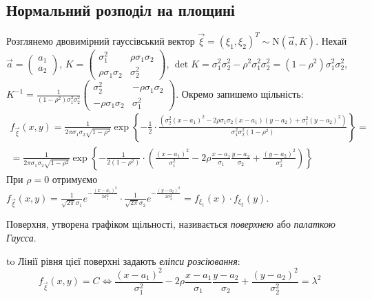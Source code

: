 \subsection{Нормальний розподіл на площині} 
Розглянемо двовимірний гауссівський вектор $\vec{\xi} = (\xi_1, \xi_2)^T \sim \mathrm{N}(\vec{a}, K)$.
Нехай $\vec{a} = \begin{pmatrix}
    a_1 \\ a_2
\end{pmatrix}$, $K = \begin{pmatrix}
    \sigma_1^2 & \rho \sigma_1 \sigma_2 \\
    \rho \sigma_1 \sigma_2 & \sigma_2^2
\end{pmatrix}$, $\det{K} = \sigma_1^2 \sigma_2^2 - \rho^2 \sigma_1^2 \sigma_2^2 = (1-\rho^2)\sigma_1^2\sigma_2^2$, 
$K^{-1} = \frac{1}{(1-\rho^2)\sigma_1^2\sigma_2^2}\begin{pmatrix}
    \sigma_2^2 & -\rho \sigma_1 \sigma_2 \\
    -\rho \sigma_1 \sigma_2 & \sigma_1^2
\end{pmatrix}$.
Окремо запишемо щільність:
\begin{equation}
    \begin{gathered}
        f_{\vec{\xi}}(x,y) = \frac{1}{2\pi\sigma_1\sigma_2\sqrt{1-\rho^2}} \exp\left\{-\frac{1}{2}\cdot
        \frac{\left( \sigma_2^2(x-a_1)^2 - 2\rho\sigma_1\sigma_2(x-a_1)(y-a_2) + \sigma_1^2(y-a_2)^2\right)}{\sigma_1^2\sigma_2^2(1-\rho^2)}
        \right\} = \\
        = \frac{1}{2\pi\sigma_1\sigma_2\sqrt{1-\rho^2}} \exp\left\{
            -\frac{1}{2(1-\rho^2)}\cdot
            \left(\frac{(x-a_1)^2}{\sigma_1^2} -
            2\rho\frac{x-a_1}{\sigma_1}\frac{y-a_2}{\sigma_2} +
            \frac{(y-a_2)^2}{\sigma_2^2}
            \right) 
        \right\}
    \end{gathered}
\end{equation}
При $\rho = 0$ отримуємо $f_{\vec{\xi}}(x,y) = \frac{1}{\sqrt{2\pi}\sigma_1} e^{-\frac{(x-a_1)^2}{2\sigma_1^2}} \cdot \frac{1}{\sqrt{2\pi}\sigma_2} e^{-\frac{(y-a_2)^2}{2\sigma_2^2}} = f_{\xi_1}(x)\cdot f_{\xi_2}(y)$.
\vspace{0.5em}

Поверхня, утворена графіком щільності,
називається \emph{поверхнею} або \emph{палаткою Гаусса}.
 
\hbox to 
Лінії рівня цієї поверхні задають \emph{еліпси розсіювання}:
$$f_{\vec{\xi}}(x,y) = C \Leftrightarrow \frac{(x-a_1)^2}{\sigma_1^2} -
2\rho\frac{x-a_1}{\sigma_1}\frac{y-a_2}{\sigma_2} +
\frac{(y-a_2)^2}{\sigma_2^2} = \lambda^2$$

